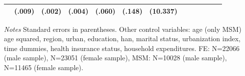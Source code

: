 \begin{table}[p]
\begin{adjustbox}{max width=\linewidth}
\begin{threeparttable}
{\begin{tabular}{l*{6}{SS}}
                &   (.009)         &   (.002)         &   (.004)         &   (.060)         &   (.148)         & (10.337)         \\                          
\bottomrule
\end{tabular}
\begin{tablenotes}
\item \textit{Notes}   Standard errors in parentheses.
Other control variables: age (only MSM) age squared, region, urban, education, han, marital status, urbanization index, time dummies, health insurance status, household expenditures. FE:  N=22066 (male sample), N=23051 (female sample), MSM: N=10028 (male sample), N=11465 (female sample).
\end{tablenotes}
}
\end{threeparttable}
\end{adjustbox}
\end{table}

\clearpage


